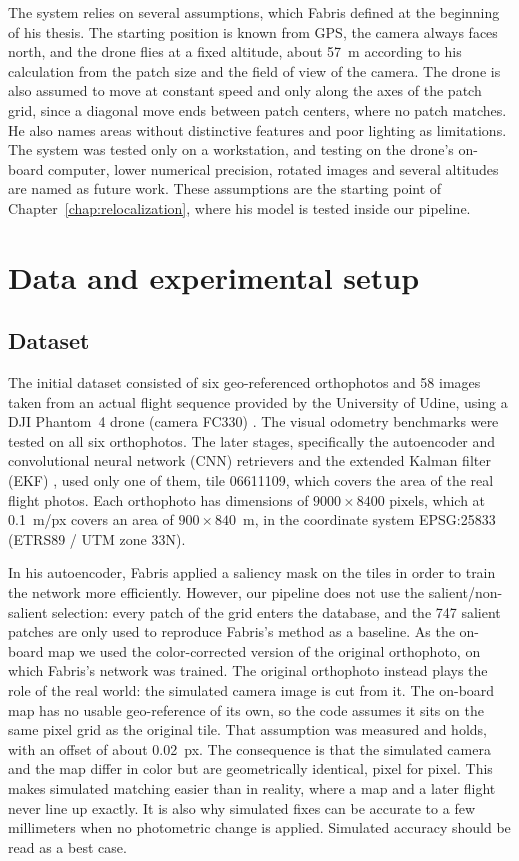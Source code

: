 \documentclass[english, Lau, oneside]{sapthesis}%
\begin{document}
The system relies on several assumptions, which Fabris defined at the beginning of his thesis. The starting position is known from GPS, the camera always faces north, and the drone flies at a fixed altitude, about 57~m according to his calculation from the patch size and the field of view of the camera. The drone is also assumed to move at constant speed and only along the axes of the patch grid, since a diagonal move ends between patch centers, where no patch matches. He also names areas without distinctive features and poor lighting as limitations. The system was tested only on a workstation, and testing on the drone's on-board computer, lower numerical precision, rotated images and several altitudes are named as future work. These assumptions are the starting point of Chapter~\ref{chap:relocalization}, where his model is tested inside our pipeline.

\chapter{Data and experimental setup}
\label{chap:data}
\section{Dataset}
\label{sec:dataset}
The initial dataset consisted of six geo-referenced orthophotos and 58 images taken from an actual flight sequence provided by the University of Udine, using a DJI Phantom~4 drone (camera FC330) \citep{dji2016phantom4}. The visual odometry benchmarks were tested on all six orthophotos. The later stages, specifically the autoencoder and convolutional neural network (CNN) retrievers and the extended Kalman filter (EKF) \citep{kalman1960}, used only one of them, tile 06611109, which covers the area of the real flight photos. Each orthophoto has dimensions of $9000 \times 8400$ pixels, which at 0.1~m/px covers an area of $900 \times 840$~m, in the coordinate system EPSG:25833 (ETRS89 / UTM zone 33N).

In his autoencoder, Fabris applied a saliency mask on the tiles in order to train the network more efficiently. However, our pipeline does not use the salient/non-salient selection: every patch of the grid enters the database, and the 747 salient patches are only used to reproduce Fabris's method as a baseline. As the on-board map we used the color-corrected version of the original orthophoto, on which Fabris's network was trained. The original orthophoto instead plays the role of the real world: the simulated camera image is cut from it. The on-board map has no usable geo-reference of its own, so the code assumes it sits on the same pixel grid as the original tile. That assumption was measured and holds, with an offset of about 0.02~px. The consequence is that the simulated camera and the map differ in color but are geometrically identical, pixel for pixel. This makes simulated matching easier than in reality, where a map and a later flight never line up exactly. It is also why simulated fixes can be accurate to a few millimeters when no photometric change is applied. Simulated accuracy should be read as a best case.
\end{document}
